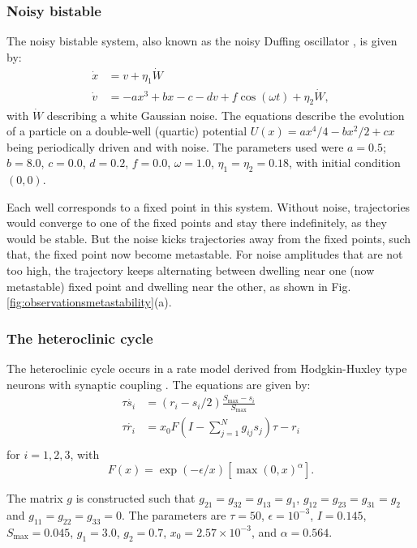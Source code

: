 \documentclass[reprint,onecolumn,superscriptaddress,showpacs,amsmath,amssymb,aps,floatfix]{revtex4-2}
\theoremstyle{definition}
\begin{document}
\subsubsection{Noisy bistable}
The noisy bistable system, also known as the noisy Duffing oscillator \cite{strogatz2002nonlinear}, is given by:
\begin{align}
    \dot{x} &= v + \eta_1 \dot{W}\\ 
    \dot{v} &= -ax^3 + bx -c -dv + f\cos(\omega t) + \eta_2 \dot{W},
\end{align}
with $\dot{W}$ describing a white Gaussian noise. The equations describe the evolution of a particle on a double-well (quartic) potential $U(x) = ax^4/4 -bx^2/2 +cx$ being periodically driven and with noise.
The parameters used were $a=0.5$; $b=8.0$, $c=0.0$, $d = 0.2$, $f = 0.0$, $\omega = 1.0$, $\eta_1= \eta_2 = 0.18$, with initial condition $(0, 0)$. 

Each well corresponds to a fixed point in this system. Without noise, trajectories would converge to one of the fixed points and stay there indefinitely, as they would be stable. But the noise kicks trajectories away from the fixed points, such that, the fixed point now become metastable. For noise amplitudes that are not too high, the trajectory keeps alternating between dwelling near one (now metastable) fixed point and dwelling near the other, as shown in Fig. \ref{fig:observationsmetastability}(a). 

\subsubsection{The heteroclinic cycle}
The heteroclinic cycle occurs in a rate model derived from Hodgkin-Huxley type neurons with synaptic coupling \cite{ashwin2011criteria}. The equations are given by:
\begin{align}
\tau\dot{s_i} &= \left( r_i - s_i/2 \right) \frac{S_\mathrm{max} - s_i}{S_\mathrm{max}} \\
\tau\dot{r_i} &= x_0 F\left( I - \sum_{j=1}^N g_{ij} s_j \right) \tau - r_i \\
\end{align}
for $i = 1, 2, 3$, with 
\begin{equation}
    F(x) = \exp(-\epsilon/x) [\max(0, x)^\alpha ]. 
\end{equation}

The matrix $g$ is constructed such that $g_{21} = g_{32} = g_{13} = g_1$, $g_{12} = g_{23} = g_{31} = g_2$ and $g_{11} = g_{22} = g_{33} = 0$. The parameters are $\tau = 50$, $\epsilon = 10^{-3}$, $I = 0.145$, $S_\mathrm{max} = 0.045$, $g_1 = 3.0$, $g_2 = 0.7$, $x_0 = 2.57 \times 10^{-3}$, and $\alpha = 0.564$.
\end{document}
